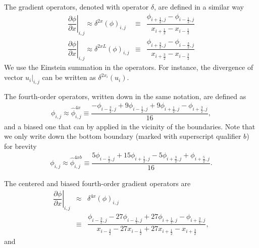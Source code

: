 \documentclass[gmd]{copernicus}
\begin{document}
The gradient operators, denoted with operator $\delta$, are defined in a similar way
\begin{eqnarray}
\left. \dfrac{\partial \phi}{\partial x}\right|_{i,j} \approx \delta^{2x} \left( \phi \right)_{i,j} & \equiv & \dfrac{\phi_{i+\frac{1}{2},j} - \phi_{i-\frac{1}{2},j}}
                                                                                                                 {   x_{i+\frac{1}{2}}   -    x_{i-\frac{1}{2}  }} \\
\left. \dfrac{\partial \phi}{\partial x}\right|_{i,j} \approx \delta^{2xL} \left( \phi \right)_{i,j}& \equiv & \dfrac{\phi_{i+\frac{3}{2},j} - \phi_{i-\frac{3}{2},j}}
                                                                                                                  {   x_{i+\frac{3}{2}}   -    x_{i-\frac{3}{2}  }}
\end{eqnarray}
We use the Einstein summation in the operators. For instance, the divergence of vector $\left.u_i\right|_{i,j}$ can be written as $\delta^{2x_i}\left( u_i \right)$.
% 

The fourth-order operators, written down in the same notation, are defined as
\begin{eqnarray}
\phi_{i,j} \approx \widehat{\phi}^{4x}_{i,j} \equiv \dfrac{- \phi_{i-\frac{3}{2},j} + 9 \phi_{i-\frac{1}{2},j} + 9 \phi_{i+\frac{1}{2},j} - \phi_{i+\frac{3}{2},j}}{16},\label{eq:interp4}
\end{eqnarray}
and a biased one that can by applied in the vicinity of the boundaries. Note that we only write down the bottom boundary (marked with superscript qualifier $b$) for brevity
\begin{eqnarray}
\phi_{i,j} \approx \widehat{\phi}^{4xb}_{i,j} \equiv \dfrac{ 5 \phi_{i-\frac{1}{2},j} + 15 \phi_{i+\frac{1}{2},j} - 5 \phi_{i+\frac{3}{2},j} + \phi_{i+\frac{5}{2},j}}{16}.
\end{eqnarray}

The centered and biased fourth-order gradient operators are
\begin{eqnarray}
\nonumber
\left. \dfrac{\partial \phi}{\partial x}\right|_{i,j} & \approx & \delta^{4x} \left( \phi \right)_{i,j}\\
& \equiv & \dfrac{\phi_{i-\frac{3}{2},j} - 27 \phi_{i-\frac{1}{2},j} + 27 \phi_{i+\frac{1}{2},j} - \phi_{i+\frac{3}{2},j}}
             {       x_{i-\frac{3}{2}}   - 27    x_{i-\frac{1}{2}}   + 27    x_{i+\frac{1}{2}}   -    x_{i+\frac{3}{2}}},
\end{eqnarray}
and
\end{document}
